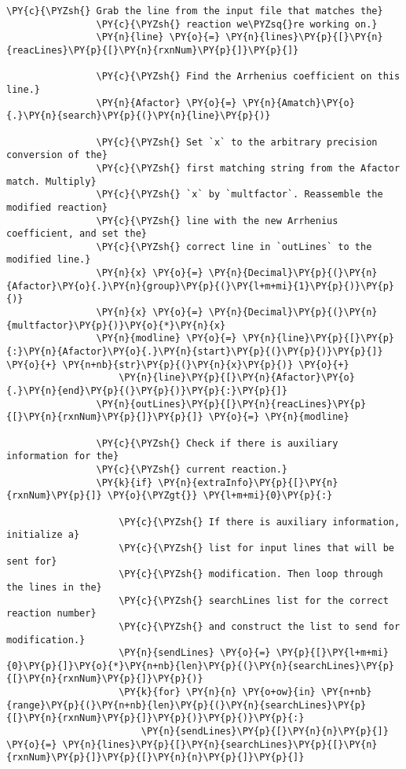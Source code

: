 \begin{Verbatim}[commandchars=\\\{\}]
                \PY{c}{\PYZsh{} Grab the line from the input file that matches the}
                \PY{c}{\PYZsh{} reaction we\PYZsq{}re working on.}
                \PY{n}{line} \PY{o}{=} \PY{n}{lines}\PY{p}{[}\PY{n}{reacLines}\PY{p}{[}\PY{n}{rxnNum}\PY{p}{]}\PY{p}{]}

                \PY{c}{\PYZsh{} Find the Arrhenius coefficient on this line.}
                \PY{n}{Afactor} \PY{o}{=} \PY{n}{Amatch}\PY{o}{.}\PY{n}{search}\PY{p}{(}\PY{n}{line}\PY{p}{)}

                \PY{c}{\PYZsh{} Set `x` to the arbitrary precision conversion of the}
                \PY{c}{\PYZsh{} first matching string from the Afactor match. Multiply}
                \PY{c}{\PYZsh{} `x` by `multfactor`. Reassemble the modified reaction}
                \PY{c}{\PYZsh{} line with the new Arrhenius coefficient, and set the}
                \PY{c}{\PYZsh{} correct line in `outLines` to the modified line.}
                \PY{n}{x} \PY{o}{=} \PY{n}{Decimal}\PY{p}{(}\PY{n}{Afactor}\PY{o}{.}\PY{n}{group}\PY{p}{(}\PY{l+m+mi}{1}\PY{p}{)}\PY{p}{)}
                \PY{n}{x} \PY{o}{=} \PY{n}{Decimal}\PY{p}{(}\PY{n}{multfactor}\PY{p}{)}\PY{o}{*}\PY{n}{x}
                \PY{n}{modline} \PY{o}{=} \PY{n}{line}\PY{p}{[}\PY{p}{:}\PY{n}{Afactor}\PY{o}{.}\PY{n}{start}\PY{p}{(}\PY{p}{)}\PY{p}{]} \PY{o}{+} \PY{n+nb}{str}\PY{p}{(}\PY{n}{x}\PY{p}{)} \PY{o}{+}
                    \PY{n}{line}\PY{p}{[}\PY{n}{Afactor}\PY{o}{.}\PY{n}{end}\PY{p}{(}\PY{p}{)}\PY{p}{:}\PY{p}{]}
                \PY{n}{outLines}\PY{p}{[}\PY{n}{reacLines}\PY{p}{[}\PY{n}{rxnNum}\PY{p}{]}\PY{p}{]} \PY{o}{=} \PY{n}{modline}

                \PY{c}{\PYZsh{} Check if there is auxiliary information for the}
                \PY{c}{\PYZsh{} current reaction.}
                \PY{k}{if} \PY{n}{extraInfo}\PY{p}{[}\PY{n}{rxnNum}\PY{p}{]} \PY{o}{\PYZgt{}} \PY{l+m+mi}{0}\PY{p}{:}

                    \PY{c}{\PYZsh{} If there is auxiliary information, initialize a}
                    \PY{c}{\PYZsh{} list for input lines that will be sent for}
                    \PY{c}{\PYZsh{} modification. Then loop through the lines in the}
                    \PY{c}{\PYZsh{} searchLines list for the correct reaction number}
                    \PY{c}{\PYZsh{} and construct the list to send for modification.}
                    \PY{n}{sendLines} \PY{o}{=} \PY{p}{[}\PY{l+m+mi}{0}\PY{p}{]}\PY{o}{*}\PY{n+nb}{len}\PY{p}{(}\PY{n}{searchLines}\PY{p}{[}\PY{n}{rxnNum}\PY{p}{]}\PY{p}{)}
                    \PY{k}{for} \PY{n}{n} \PY{o+ow}{in} \PY{n+nb}{range}\PY{p}{(}\PY{n+nb}{len}\PY{p}{(}\PY{n}{searchLines}\PY{p}{[}\PY{n}{rxnNum}\PY{p}{]}\PY{p}{)}\PY{p}{)}\PY{p}{:}
                        \PY{n}{sendLines}\PY{p}{[}\PY{n}{n}\PY{p}{]} \PY{o}{=} \PY{n}{lines}\PY{p}{[}\PY{n}{searchLines}\PY{p}{[}\PY{n}{rxnNum}\PY{p}{]}\PY{p}{[}\PY{n}{n}\PY{p}{]}\PY{p}{]}


\end{Verbatim}
